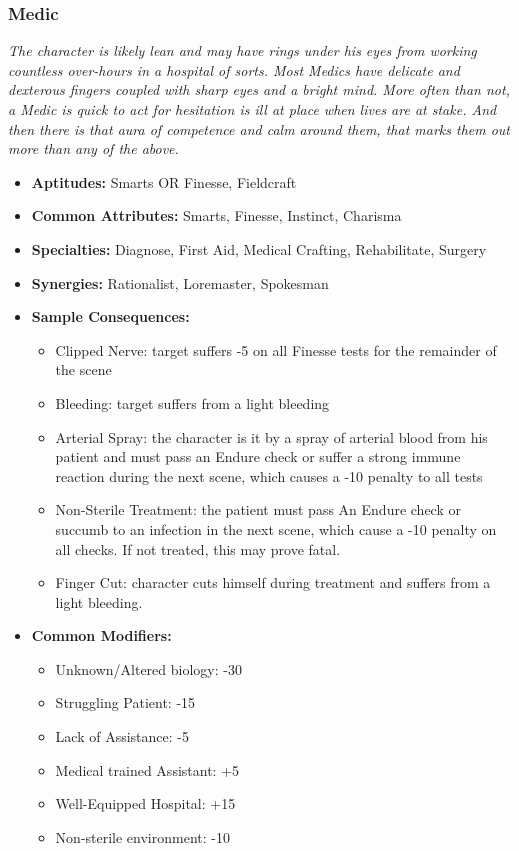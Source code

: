 \subsubsection{Medic}\label{Medic}
\textit{The character is likely lean and may have rings under his eyes from working countless over-hours in a hospital of sorts.
Most Medics have delicate and dexterous fingers coupled with sharp eyes and a bright mind.
More often than not, a Medic is quick to act for hesitation is ill at place when lives are at stake.
And then there is that aura of competence and calm around them, that marks them out more than any of the above.}
\begin{itemize}
	\item \textbf{Aptitudes:} Smarts OR Finesse, Fieldcraft
	\item \textbf{Common Attributes:} Smarts, Finesse, Instinct, Charisma
	\item \textbf{Specialties:} Diagnose, First Aid, Medical Crafting, Rehabilitate, Surgery
	\item \textbf{Synergies:} Rationalist, Loremaster, Spokesman
	\item \textbf{Sample Consequences:} 
	\begin{itemize}
		\item Clipped Nerve: target suffers -5 on all Finesse tests for the remainder of the scene
		\item Bleeding: target suffers from a light bleeding
		\item Arterial Spray: the character is it by a spray of arterial blood from his patient and must pass an Endure check or suffer a strong immune reaction during the next scene, which causes a -10 penalty to all tests
		\item Non-Sterile Treatment: the patient must pass An Endure check or succumb to an infection in the next scene, which cause a -10 penalty on all checks. If not treated, this may prove fatal.
		\item Finger Cut: character cuts himself during treatment and suffers from a light bleeding.
	\end{itemize}
	\item \textbf{Common Modifiers:}
	\begin{itemize}
		\item Unknown/Altered biology: -30
		\item Struggling Patient: -15
		\item Lack of Assistance: -5
		\item Medical trained Assistant: +5
		\item Well-Equipped Hospital: +15
		\item Non-sterile environment: -10
	\end{itemize}
\end{itemize}

